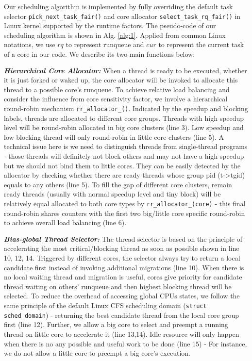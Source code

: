 \documentclass[sigplan,review,anonymous]{acmart}\settopmatter{printfolios=true,printccs=false,printacmref=false}
\begin{document}
Our scheduling algorithm is implemented by fully overriding the default task selector \texttt{pick\_next\_task\_fair()} and core allocator \texttt{select\_task\_rq\_fair()} in Linux kernel supported by the runtime factors. The pseudo-code of our scheduling algorithm is shown in Alg. \ref{alg:1}. 
Applied from common Linux notations, we use $rq$ to represent runqueue and $cur$ to represent the current task of a core in our code. We describe its two main functions below:

\textbf{\textit{Hierarchical Core Allocator:}}
When a thread is ready to be executed, whether it is just forked or waked up, the core allocator will be invoked to allocate this thread to a possible core's runqueue. To achieve relative load balancing and consider the influence from core sensitivity factor, we involve a hierarchical round-robin mechanism \texttt{rr\_allocator\_()}. Indicated by the speedup and blocking labels, threads are allocated to different core groups. Threads with high speedup level will be round-robin allocated in big core clusters (line 3). Low speedup and low blocking thread will only round-robin in little core clusters (line 5). A technical issue here is we need to distinguish threads from single-thread programs - those threads will definitely not block others and may not have a high speedup but we should not bind them to little cores. They can be easily detected by the allocator by checking whether there are ready threads whose group pid (t->tgid) equals to any others (line 5). To fill the gap of different core clusters, remain ready threads (usually with normal speedup level and tiny block) will be relatively equal allocated to both core types by \texttt{rr\_allocator\_(core)} - this final round-robin shares counters with the first two big/little core specific round-robin to achieve overall load balancing (line 6).  

\textbf{\textit{Bias-global Thread Selector:}}
The thread selector is based on the principle of accelerating the most critical/blocking thread as soon as possible shown in line 10, 12, 14. Triggered by different cores, the selector always try to return  a local candidate first instead of invoking additional migrations (line 10). When there is no local waiting thread and migration is useful, cores give priority for candidate thread waiting on others' runqueue and then highest blocking thread will be selected.
To reduce the overhead of accessing global CPUs states, we follow the same principle of the default Linux CFS scheduling domain (\texttt{struct sched\_domain}) - returning the best candidate thread from the local core group first (line 12).
Further, we allow a big core to select and preempt a running thread on little core to accelerate it (line 13,14). Idle resource will only happen when there is no any possible and useful work to be done (line 15) - For instance, we do not allow a little core to preempt a big core's execution. 
\end{document}
